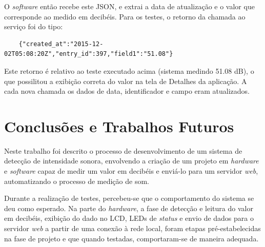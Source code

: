 \documentclass[
    12pt,               %
    openright,          %
    oneside,
    a4paper,            
    english,            %
    brazil              %
    ]{abntex2}
\begin{document}
O \textit{software} então recebe este JSON, e extrai a data de atualização e o valor que corresponde ao medido em decibéis. Para os testes, o retorno da chamada ao serviço foi do tipo:

\begin{verbatim}
    {"created_at":"2015-12-02T05:08:20Z","entry_id":397,"field1":"51.08"}
\end{verbatim}

Este retorno é relativo ao teste executado acima (sistema medindo 51.08 dB), o que possilitou a exibição correta do valor na tela de Detalhes da aplicação. A cada nova chamada os dados de data, identificador e campo eram atualizados. 





\chapter{Conclusões e Trabalhos Futuros}\label{conclusao}

Neste trabalho foi descrito o processo de desenvolvimento de um sistema de detecção de intensidade sonora, envolvendo a criação de um projeto em \textit{hardware} e \textit{software} capaz de medir um valor em decibéis e enviá-lo para um servidor \textit{web}, automatizando o processo de medição de som.

Durante a realização de testes, percebeu-se que o comportamento do sistema se deu como esperado. Na parte do \textit{hardware}, a fase de detecção e leitura do valor em decibéis, exibição do dado no LCD, LEDs de \textit{status} e envio de dados para o servidor \textit{web} a partir de uma conexão à rede local, foram etapas pré-estabelecidas na fase de projeto e que quando testadas, comportaram-se de maneira adequada.
\end{document}
